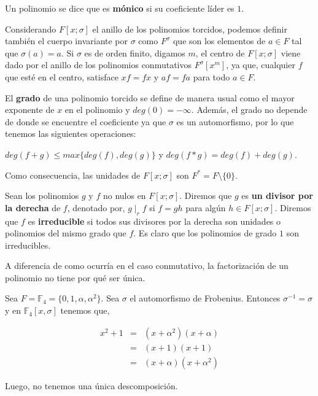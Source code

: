 Un polinomio se dice que es \textbf{mónico} si su coeficiente líder es $1$.

Considerando $F[x;\sigma]$ el anillo de los polinomios torcidos, podemos definir también el cuerpo invariante por $\sigma$ como $F^{\sigma}$ que son los elementos de $a \in F$ tal que $\sigma(a) = a$. Si $\sigma$ es de orden finito, digamos $m$, el centro de $F[x;\sigma]$ viene dado por el anillo de los polinomios conmutativos $F^{\sigma}[x^m]$, ya que, cualquier $f$ que esté en el centro, satisface $xf = fx$ y $af = fa$ para todo $a \in F$.


\begin{definition}
El \textbf{grado} de una polinomio torcido se define de manera usual como el mayor exponente de $x$ en el polinomio y $deg(0) = - \infty$. Además, el grado no depende de donde se encuentre el coeficiente ya que $\sigma$ es un automorfismo, por lo que tenemos las siguientes operaciones:

$deg(f+g) \leq max\{deg(f),deg(g)\} $ y $ deg(f*g) = deg(f) + deg(g)$.

\end{definition}

Como consecuencia, las unidades de $F[x;\sigma]$ son $F^* = F \setminus \{0 \}$.

\begin{definition}
Sean los polinomios $g$ y $f$ no nulos en $F[x;\sigma]$. Diremos que $g$ es \textbf{un divisor por la derecha} de $f$, denotado por, $g \mid_r f$ si $f = gh$ para algún $h \in F[x;\sigma]$. Diremos que $f$ es \textbf{irreducible} si todos sus divisores por la derecha son unidades o polinomios del mismo grado que $f$. Es claro que los polinomios de grado $1$ son irreducibles.
\end{definition}


A diferencia de como ocurría en el caso conmutativo, la factorización de un polinomio no tiene por qué ser única. 

\begin{exampleth}
Sea $F = \mathbb{F}_{4} = \{ 0,1,\alpha,\alpha^2 \}$. Sea $\sigma$ el  automorfismo de Frobenius. Entonces $\sigma^{-1} = \sigma$ y en $\mathbb{F}_4[x,\sigma]$ tenemos que,

\begin{eqnarray*}
    x^2+1 & = & (x+\alpha^2)(x+\alpha) \\
          & = & (x+1)(x+1) \\
          & = & (x+\alpha)(x+\alpha^2)
\end{eqnarray*}

Luego, no tenemos una única descomposición.
\end{exampleth}

